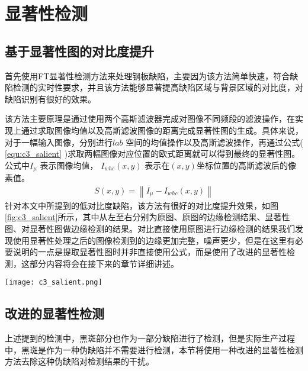    \section{显著性检测}
        \subsection{基于显著性图的对比度提升}
        首先使用FT显著性检测方法\cite{Achanta2009Frequency}来处理钢板缺陷，主要因为该方法简单快速，符合缺陷检测的实时性要求，并且该方法能够显著提高缺陷区域与背景区域的对比度，对缺陷识别有很好的效果。

        该方法主要原理是通过使用两个高斯滤波器完成对图像不同频段的滤波操作，在实现上通过求取图像均值以及高斯滤波图像的距离完成显著性图的生成。具体来说，对于一幅输入图像，分别进行$lab$ 空间的均值操作以及高斯滤波操作，再通过公式( \ref{equ:c3_salient} )求取两幅图像对应位置的欧式距离就可以得到最终的显著性图。公式中$I_\mu$ 表示图像均值， $I_{whc}\left( {x, y} \right)$ 表示在$\left( {x, y} \right)$坐标位置的高斯滤波后的像素值。
        \begin{eqnarray}
        S\left( {x,y} \right) = \left\| {I_\mu - I_{whc}\left( {x, y}\right)} \right\|
        \label{equ:c3_salient}
        \end{eqnarray}
        针对本文中所提到的低对比度缺陷，该方法有很好的对比度提升效果，如图\ref{fig:c3_salient}所示，其中从左至右分别为原图、原图的边缘检测结果、显著性图、对显著性图做边缘检测的结果。对比直接使用原图进行边缘检测的结果我们发现使用显著性处理之后的图像检测到的边缘更加完整，噪声更少，但是在这里有必要说明的一点是提取显著性图时并非直接使用公式，而是使用了改进的显著性检测，这部分内容将会在接下来的章节详细讲述。

        \begin{figure*}[!h]
        \centering
        \texttt{[image: c3\_salient.png]}
        \caption{显著性检测对缺陷检测的提升效果}
        \label{fig:c3_salient}
        \end{figure*}

        \subsection{改进的显著性检测}
        上述提到的检测中，黑斑部分也作为一部分缺陷进行了检测，但是实际生产过程中，黑斑是作为一种伪缺陷并不需要进行检测，本节将使用一种改进的显著性检测方法去除这种伪缺陷对检测结果的干扰。

